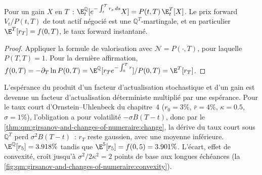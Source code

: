 \begin{proposition}\label{prop:qm:girsanov-and-changes-of-numeraire:forward}
Pour un gain $X$ en $T$~: $\E^{\mathbb Q}_t[e^{-\int_t^Tr_s\,ds}X] = P(t, T)\,\E^{T}_t[X]$. Le prix forward
$V_t/P(t,T)$ de tout actif négocié est une $\mathbb Q^T$-martingale, et en particulier $\E^T[r_T] = f(0, T)$,
le taux forward instantané.
\end{proposition}

\begin{proof}
Appliquer la formule de valorisation avec $\mathcal N = P(\cdot, T)$, pour laquelle $P(T, T) = 1$. Pour la dernière affirmation,
$f(0,T) = -\partial_T\ln P(0,T) = \E^{\mathbb Q}[r_Te^{-\int_0^Tr}]/P(0,T) = \E^T[r_T]$.
\end{proof}

L'espérance du produit d'un facteur d'actualisation stochastique et d'un gain est devenue un
facteur d'actualisation déterministe multiplié par une espérance. Pour le taux court d'Ornstein--Uhlenbeck du chapitre~4
($r_0 = 3\%$, $\bar r = 4\%$, $\kappa = 0.5$, $\sigma = 1\%$), l'obligation a pour volatilité $-\sigma B(T - t)$, donc par
le \cref{thm:qm:girsanov-and-changes-of-numeraire:change}, la dérive du taux court sous $\mathbb Q^T$ perd
$\sigma^2B(T - t)$~: $r_T$ reste gaussien, avec une moyenne inférieure. $\E^{\mathbb Q}[r_5] = 3.918\%$ tandis que $\E^5[r_5] = f(0,
5) = 3.901\%$. L'écart, effet de convexité, croît jusqu'à $\sigma^2/2\kappa^2 = 2$ points de base aux longues échéances
(la \cref{fig:qm:girsanov-and-changes-of-numeraire:convexity}).

\begin{omfigure}

\label{fig:qm:girsanov-and-changes-of-numeraire:convexity}
\end{omfigure}


